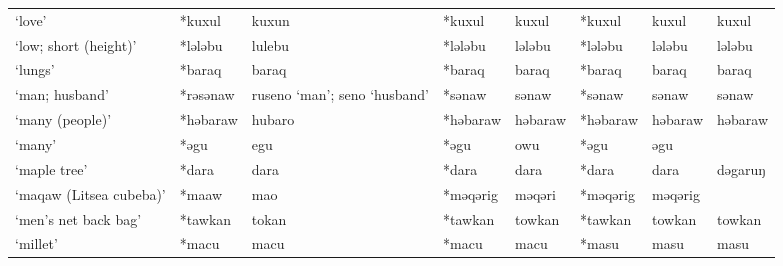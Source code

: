 \begin{landscape}
\begin{longtable}[c]{@{}p{3cm}<{\raggedright}p{2.75cm}<{\raggedright}p{2.75cm}<{\raggedright}p{2.75cm}<{\raggedright}p{2.75cm}<{\raggedright}p{2.75cm}<{\raggedright}p{2.75cm}<{\raggedright}p{2.75cm}<{\raggedright}@{}}
`love'                                               & *kuxul       & kuxun                         & *kuxul         & kuxul                      & *kuxul           & kuxul                    & kuxul                             \\
`low; short (height)'                                & *lələbu      & lulebu                        & *lələbu        & lələbu                     & *lələbu          & lələbu                   & lələbu                            \\
`lungs'                                              & *baraq       & baraq                         & *baraq         & baraq                      & *baraq           & baraq                    & baraq                             \\
`man; husband'                                       & *rəsənaw     & ruseno `man'; seno `husband'  & *sənaw         & sənaw                      & *sənaw           & sənaw                    & sənaw                             \\
`many (people)'                                      & *həbaraw     & hubaro                        & *həbaraw       & həbaraw                    & *həbaraw         & həbaraw                  & həbaraw                           \\
`many'                                               & *əgu         & egu                           & *əgu           & owu                        & *əgu             & əgu                      &                                   \\
`maple tree'                                         & *dara        & dara                          & *dara          & dara                       & *dara            & dara                     & dəgaruŋ                           \\
`maqaw (Litsea cubeba)'                              & *maaw        & mao                           & *məqərig       & məqəri                     & *məqərig         & məqərig                  &                                   \\
`men's net back bag'                                 & *tawkan      & tokan                         & *tawkan        & towkan                     & *tawkan          & towkan                   & towkan                            \\
`millet'                                             & *macu        & macu                          & *macu          & macu                       & *masu            & masu                     & masu                              \\

\end{longtable}
\end{landscape}
